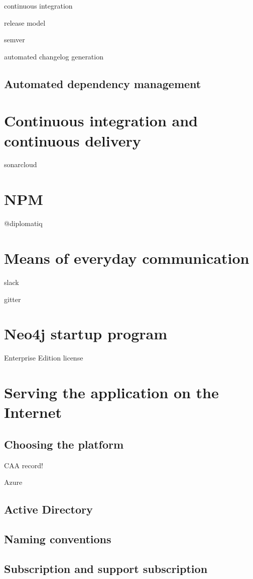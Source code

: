 continuous integration

release model

semver

automated changelog generation

\subsection{Automated dependency management}

\section{Continuous integration and continuous delivery}

sonarcloud

\section{NPM}

@diplomatiq

\section{Means of everyday communication}

slack

gitter

\section{Neo4j startup program}
Enterprise Edition license

\section{Serving the application on the Internet}

\subsection{Choosing the platform}

CAA record!

Azure
\subsection{Active Directory}
\subsection{Naming conventions}
\subsection{Subscription and support subscription}
